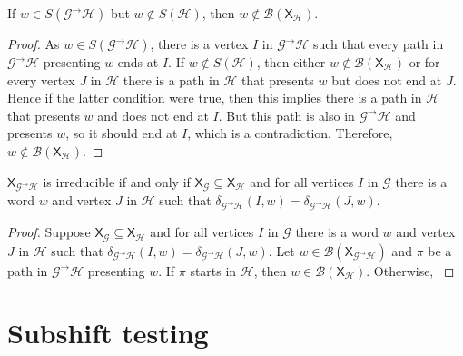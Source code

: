 \documentclass[hidelinks]{article}
\newcommand{\Gc}{\mathcal{G}}  %
\newcommand{\Hc}{\mathcal{H}}  %
\newcommand{\Bc}{\mathcal{B}}
\newcommand{\GtH}{{\Gc^\to\Hc}}
\newcommand{\shift}[1]{\mathsf{X}_{#1}}
\theoremstyle{definition}
\begin{document}
\begin{theorem}
    If \(w \in S(\GtH)\) but \(w \notin S(\Hc)\), then \(w \notin \Bc(\shift{\Hc})\). 
\end{theorem}

\begin{proof}
    As \(w \in S(\GtH)\), there is a vertex \(I\) in \(\GtH\) such that every path in 
    \(\GtH\) presenting \(w\) ends at \(I\).
    If \(w \notin S(\Hc)\), then either 
    \(w \notin \Bc(\shift{\Hc})\) or for every vertex \(J\) in \(\Hc\) there is a path
    in \(\Hc\) that presents \(w\) but does not end at \(J\). Hence if the latter 
    condition were true, then this implies there is a path in \(\Hc\) that presents \(w\) 
    and does not end at \(I\). But this path is also in \(\GtH\) and presents \(w\), so it 
    should end at \(I\), which is a contradiction. Therefore, \(w \notin \Bc(\shift{\Hc})\).
\end{proof}

\begin{theorem}
    \(\shift{\GtH}\) is irreducible if and only if \(\shift{\Gc} \subseteq \shift{\Hc}\) and for all vertices 
    \(I\) in \(\Gc\) there is a word \(w\) and vertex \(J\) in \(\Hc\) such that \(\delta_\GtH(I, w) = \delta_\GtH(J, w)\).
\end{theorem}

\begin{proof}
    Suppose \(\shift{\Gc} \subseteq \shift{\Hc}\) and for all vertices 
    \(I\) in \(\Gc\) there is a word \(w\) and vertex \(J\) in \(\Hc\) such that \(\delta_\GtH(I, w) = \delta_\GtH(J, w)\).
    Let \(w \in \Bc(\shift{\GtH})\) and \(\pi\) be a path in \(\GtH\) presenting \(w\). 
    If \(\pi\) starts in \(\Hc\), then \(w \in \Bc(\shift{\Hc})\). Otherwise, \(\)
\end{proof}

\newpage

\section{Subshift testing}
\end{document}
